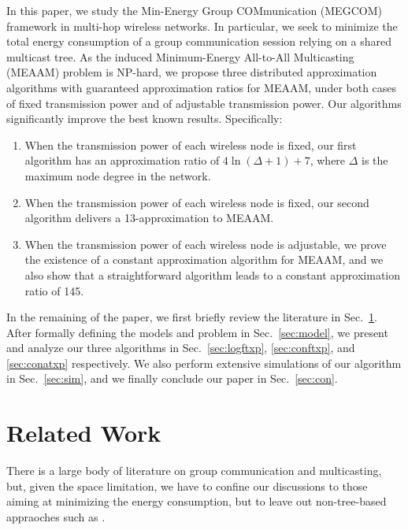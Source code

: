\documentclass[10pt, conference, compsocconf]{IEEEtran}
\begin{document}
  In this paper, we study the Min-Energy Group COMmunication (MEGCOM) framework in multi-hop wireless networks. In particular, we seek to minimize the total energy consumption of a group communication session relying on a shared multicast tree. As the induced Minimum-Energy All-to-All Multicasting (MEAAM) problem is NP-hard, we propose three distributed approximation algorithms with guaranteed approximation ratios for MEAAM, under both cases of fixed transmission power and of adjustable transmission power. Our algorithms significantly improve the best known results. Specifically:
\begin{enumerate}
\item When the transmission power of each wireless node is fixed, our first algorithm has an approximation ratio of $4\ln(\Delta+1)+7$, where $\Delta$ is the maximum node degree in the network. \item When the transmission power of each wireless node is fixed, our second algorithm delivers a 13-approximation to MEAAM. \item When the transmission power of each wireless node is adjustable, we prove the existence of a constant approximation algorithm for MEAAM, and we also show that a straightforward algorithm leads to a constant approximation ratio of 145. \end{enumerate}

  In the remaining of the paper, we first briefly review the literature in Sec.~\ref{sec:rlw}. After formally defining the models and problem in Sec.~\ref{sec:model}, we present and analyze our three algorithms in Sec.~\ref{sec:logftxp}, \ref{sec:conftxp}, and \ref{sec:conatxp} respectively. We also perform extensive simulations of our algorithm in Sec.~\ref{sec:sim}, and we finally conclude our paper in Sec.~\ref{sec:con}.

\section{Related Work} \label{sec:rlw}
There is a large body of literature on group communication and multicasting, but, given the space limitation, we have to confine our discussions to those aiming at minimizing the energy consumption, but to leave out non-tree-based appraoches such as \cite{LeeSM-MONET02,TavliH-TC11}.
\end{document}
